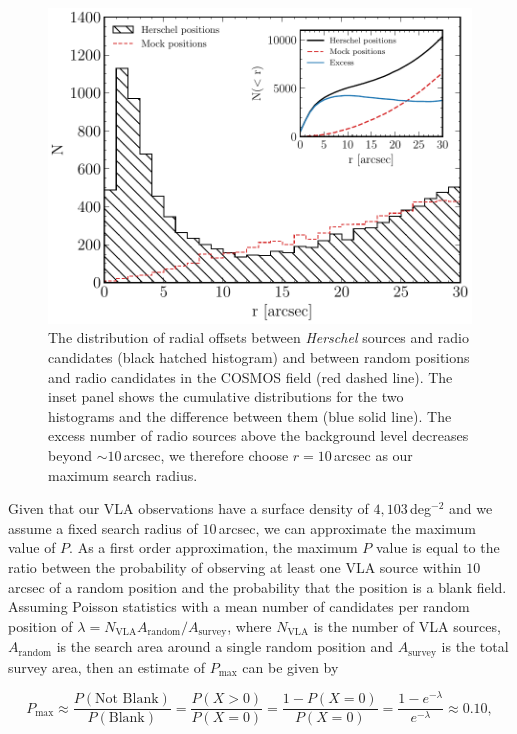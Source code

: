 \begin{figure}
	\centering
	\includegraphics[width=0.8\columnwidth]{Figures/optimal_radius.pdf}
	\caption[Distribution of radial offsets between \textit{Herschel} sources and radio objects]{The distribution of radial offsets between \textit{Herschel} sources and radio candidates (black hatched histogram) and between random positions and radio candidates in the COSMOS field (red dashed line). The inset panel shows the cumulative distributions for the two histograms and the difference between them (blue solid line). The excess number of radio sources above the background level decreases beyond $\sim10\,$arcsec, we therefore choose $r = 10\,$arcsec as our maximum search radius.}
	\label{fig:optimal_radius}
\end{figure}

Given that our VLA observations have a surface density of $4,103\,$deg$^{-2}$ and we assume a fixed search radius of $10\,$arcsec, we can approximate the maximum value of $P$. As a first order approximation, the maximum $P$ value is equal to the ratio between the probability of observing at least one VLA source within $10\,$arcsec of a random position and the probability that the position is a blank field. Assuming Poisson statistics with a mean number of candidates per random position of $\lambda = N_{\textrm{VLA}}A_{\textrm{random}}/A_{\textrm{survey}}$, where $N_{\textrm{VLA}}$ is the number of VLA sources, $A_{\textrm{random}}$ is the search area around a single random position and $A_{\textrm{survey}}$ is the total survey area, then an estimate of $P_{\textrm{max}}$ can be given by

\begin{equation}
    P_{\textrm{max}} \approx \frac{P(\textrm{Not Blank})}{P(\textrm{Blank})} = \frac{P(X > 0)}{P(X = 0)} = \frac{1 - P(X = 0)}{P(X = 0)} = \frac{1 - e^{-\lambda}}{e^{-\lambda}} \approx 0.10,
\end{equation}


